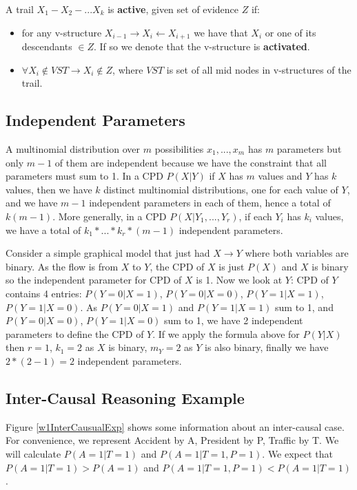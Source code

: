 \begin{defi}
A trail $X_1 - X_2 - ... X_k$ is \textbf{active}, given set of evidence $Z$ if:
\begin{itemize}
	\item for any v-structure $X_{i-1} \rightarrow X_i \leftarrow X_{i+1}$ we have that $X_i$ or one of its descendants $\in Z$. If so we denote that the v-structure is \textbf{activated}.
	\item $\forall X_i \notin VST \rightarrow X_i \notin Z$, where $VST$ is set of all mid nodes in v-structures of the trail.
\end{itemize}	
\end{defi}

\subsection{Independent Parameters}
A multinomial distribution over $m$ possibilities $x_1, ..., x_m$ has $m$ parameters but only $m-1$ of them are independent because we have the constraint that all parameters must sum to 1. In a CPD $P(X|Y)$ if $X$ has $m$ values and $Y$ has $k$ values, then we have $k$ distinct multinomial distributions, one for each value of $Y$, and we have $m-1$ independent parameters in each of them, hence a total of $k(m-1)$. More generally, in a CPD $P(X|Y_1, ..., Y_r)$, if each $Y_i$ has $k_i$ values, we have a total of $k_1*...*k_r*(m-1)$ independent parameters.

Consider a simple graphical model that just had $X \rightarrow Y$ where both variables are binary. As the flow is from $X$ to $Y$, the CPD of $X$ is just $P(X)$ and $X$ is binary so the independent parameter for CPD of $X$ is 1. Now we look at $Y$: CPD of $Y$ contains 4 entries: $P(Y = 0 | X = 1)$, $P(Y = 0 | X = 0)$, $P(Y = 1 | X = 1)$, $P(Y = 1 | X = 0)$. As $P(Y = 0 | X = 1)$ and $P(Y = 1 | X = 1)$ sum to 1, and $P(Y = 0 | X = 0)$, $P(Y = 1 | X = 0)$ sum to 1, we have 2 independent parameters to define the CPD of $Y$. If we apply the formula above for $P(Y | X)$ then $r = 1$, $k_1 = 2$ as $X$ is binary, $m_Y = 2$ as $Y$ is also binary, finally we have $2*(2-1) = 2$ independent parameters.

\subsection{Inter-Causal Reasoning Example}
Figure \ref{w1InterCausualExp} shows some information about an inter-causal case. For convenience, we represent Accident by A, President by P, Traffic by T. We will calculate $P(A = 1 | T = 1)$ and $P(A = 1 | T = 1, P = 1)$. We expect that $P(A = 1 | T = 1) > P(A = 1)$ and $P(A = 1 | T = 1, P = 1) < P(A = 1 | T = 1)$.

